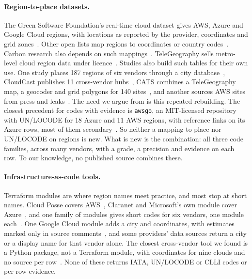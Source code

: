 \documentclass[10pt,twocolumn]{article}
\newcommand{\code}[1]{\texttt{#1}}
\begin{document}
\paragraph{Region-to-place datasets.} The Green Software Foundation's real-time cloud dataset gives AWS, Azure and Google Cloud regions, with locations as reported by the provider, coordinates and grid zones~\citep{gsf_real_time_cloud}. Other open lists map regions to coordinates or country codes~\citep{dgl_cloud_regions,wilbur_mcp_cloud_regions,ipregistry_aws_regions,cloudregion_pypi}. Carbon research also depends on such mappings~\citep{sukprasert2024limitations}. TeleGeography sells metro-level cloud region data under licence~\citep{telegeography_geocoded_license}. Studies also build such tables for their own use. One study places 187 regions of six vendors through a city database~\citep{lehdonvirta2024compute}, CloudCast publishes 11 cross-vendor hubs~\citep{rotman2022cloudcast}, CATS combines a TeleGeography map, a geocoder and grid polygons for 140 sites~\citep{chen2026cats}, and another sources AWS sites from press and leaks~\citep{yeganeh2019how}. The need we argue from is this repeated rebuilding. The closest precedent for codes with evidence is \code{awsgo}, an MIT-licensed repository with UN/LOCODE for 18 Azure and 11 AWS regions, with reference links on its Azure rows, most of them secondary~\citep{grokify_awsgo}. So neither a mapping to place nor UN/LOCODE on regions is new. What is new is the combination: all three code families, across many vendors, with a grade, a precision and evidence on each row. To our knowledge, no published source combines these.

\paragraph{Infrastructure-as-code tools.} Terraform modules are where region names meet practice, and most stop at short names. Cloud Posse covers AWS~\citep{tf_cloudposse_utils}, Claranet and Microsoft's own module cover Azure~\citep{tf_claranet_regions,tf_avm_regions}, and one family of modules gives short codes for six vendors, one module each~\citep{tf_abbreviation}. One Google Cloud module adds a city and coordinates, with estimates marked only in source comments~\citep{tf_memes_region}, and some providers' data sources return a city or a display name for that vendor alone. The closest cross-vendor tool we found is a Python package, not a Terraform module, with coordinates for nine clouds and no source per row~\citep{cloud_regions_info}. None of these returns IATA, UN/LOCODE or CLLI codes or per-row evidence.
\end{document}
